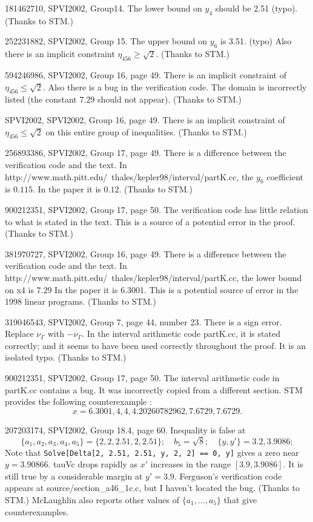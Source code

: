 \documentclass[11pt]{amsart}
\begin{document}
\smallskip

181462710, SPVI2002, Group14.  The lower bound on $y_4$ should be 2.51 (typo).
(Thanks to STM.)

252231882, SPVI2002, Group 15.  The upper bound on $y_6$ is 3.51. (typo)
Also there is an implicit constraint $\eta_{456}\ge\sqrt2$.
(Thanks to STM.)

594246986, SPVI2002, Group 16, page 49.  There is an implicit constraint of $\eta_{456}\le \sqrt2$.  Also there is a bug in the verification code.  The domain is incorrectly listed (the constant $7.29$ should not appear).  (Thanks to STM.)

SPVI2002, SPVI2002, Group 16, page 49.  There is an implicit constraint of $\eta_{456}\le\sqrt2$ on this entire group of inequalities.
(Thanks to STM.)

256893386, SPVI2002, Group 17, page 49.  There is a difference between the verification code and the text.  In http://www.math.pitt.edu/~thales/kepler98/interval/partK.cc, the $y_6$ coefficient is $0.115$.  In the paper it is $0.12$.
(Thanks to STM.)

900212351, SPVI2002, Group 17, page 50.  The verification code has little relation to what is stated in the text.  This is a source of a potential error in the proof. (Thanks to STM.)

381970727, SPVI2002, Group 16, page 49.   There is a difference between the verification code and the text.  In http://www.math.pitt.edu/~thales/kepler98/interval/partK.cc, the lower bound on x4 is 7.29  In the paper it is 6.3001.  This is a potential source of error in the 1998 linear programs.  (Thanks to STM.)

319046543, SPVI2002, Group 7, page 44, number 23.  There is a sign error.
Replace $\nu_\Gamma$ with $-\nu_\Gamma$.  In the interval arithmetic
code partK.cc, it is stated correctly; and it seems to have been used correctly throughout the proof.  It is an isolated typo.   (Thanks to STM.)

900212351, SPVI2002, Group 17, page 50.  The interval arithmetic code
in partK.cc contains a bug.  
It was incorrectly copied from a different section.
STM provides the following counterexample :
  $$
  x = {6.3001, 4,4, 4.20260782962, 7.6729, 7.6729}.
  $$

207203174, SPVI2002, Group 18.4, page 60. 
Inequality is false at 
  $$\{a_1,a_2,a_3,a_4,a_5\}=\{2,2,2.51,2,2.51\}; \quad
   b_5=\sqrt{8};\quad  \{y,y'\}={3.2,3.9086};
   $$
   Note that 
   {\tt Solve[Delta[2, 2.51, 2.51, y, 2, 2] == 0, y]} gives a zero
   near $y = 3.90866$.
   tauVc drops rapidly as $x'$ increases in the range $[3.9,3.9086]$.
   It is still true by a considerable margin at $y'=3.9$.
   Ferguson's verification code appears at 
   source/section_a46_1c.c, but I haven't
   located the bug. (Thanks to STM.)
   McLaughlin also reports other values of $\{a_1,\ldots,a_5\}$ that give
   counterexamples.
\end{document}

